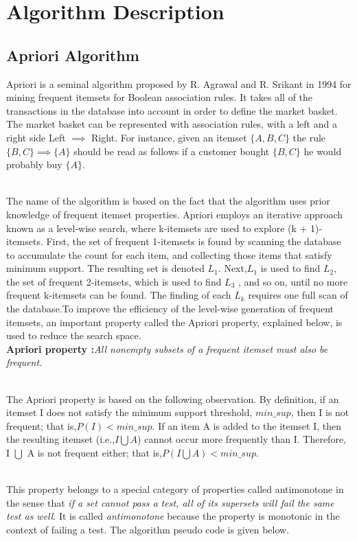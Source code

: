 \documentclass{article}\usepackage[]{graphicx}\usepackage[]{color}
\begin{document}
\section{Algorithm Description}
\subsection{Apriori Algorithm}\hspace{0.9cm}Apriori is a seminal algorithm proposed by R. Agrawal and R. Srikant in 1994 for mining frequent itemsets for Boolean association rules. It takes all of the transactions in the database into account in order to define the market basket. The market basket can be represented with association rules, with a left and a right side Left $\implies$ Right. For instance, given an itemset $\{A,B,C \}$ the rule $\{B,C \} \implies \{A \}$ should be read as follows if a customer bought $\{ B,C \}$ he would probably buy $\{A \}$.\par\\
\hspace{0.5cm}The name of the algorithm is based on the fact that the algorithm uses prior knowledge of frequent itemset properties. Apriori employs an iterative approach known as a level-wise search, where k-itemsets are used to explore (k + 1)-itemsets. First, the set of frequent 1-itemsets is found by scanning the database to accumulate the count for each item, and collecting those items that satisfy minimum support. The resulting set is denoted $L_{1}$. Next,$L_{1}$ is used to find $L_{2}$, the set of frequent 2-itemsets, which is used to find $L_{3}$ , and so on, until no more frequent k-itemsets can be found. The finding of each $L_{k}$ requires one full scan of the database.To improve the efficiency of the level-wise generation of frequent itemsets, an important property called the Apriori property, explained below, is used to reduce the search space.\cite{[3]}\\
\textbf{Apriori property :}\textit{All nonempty subsets of a frequent itemset must also be frequent.}\par\\
\hspace{0.5cm}The Apriori property is based on the following observation. By definition, if an itemset
I does not satisfy the minimum support threshold, $min\_sup$, then I is not frequent; that
is,$P(I) < min\_sup$. If an item A is added to the itemset I, then the resulting itemset (i.e.,$I\bigcup A$) cannot occur more frequently than I. Therefore, I $\bigcup$ A is not frequent either; that is,$P(I \bigcup A) < min\_sup$.\par\\
\hspace{0.5cm}This property belongs to a special category of properties called antimonotone in the
sense that \textit{if a set cannot pass a test, all of its supersets will fail the same test as well}. It is called \textit{antimonotone} because the property is monotonic in the context of failing a test. The algorithm pseudo code is given below.\par\\
\end{document}
